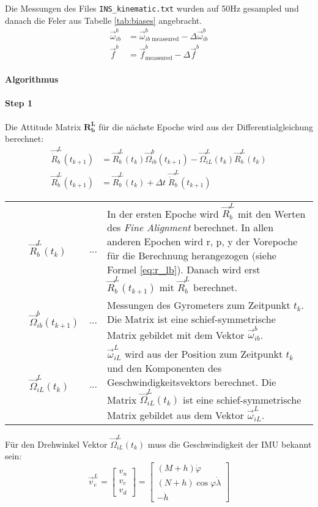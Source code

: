 Die Messungen des Files {\tt INS\_kinematic.txt} wurden auf 50\;Hz gesampled und danach die Feler aus Tabelle \ref{tab:biases} angebracht. 
\begin{align}
 	\vec{\omega}_{ib}^b &= \vec{\omega}_{ib \text{ meassured}}^b - \Delta \vec{\omega}_{ib}^b\\
    	\vec{f}^b &= \vec{f}^b_{\text{meassured}} - \Delta \vec{f}^b
\end{align}

\paragraph{Algorithmus}

\paragraph{Step 1}

Die Attitude Matrix $\mathbf{R_b^L}$ für die nächste Epoche wird aus der Differentialgleichung berechnet:
\begin{align}
	\vec{\dot{R}}_b^L(t_{k+1}) &= \vec{R}_b^L(t_k)\vec{\Omega}_{ib}^b(t_{k+1}) - \vec{\Omega}_{iL}^L(t_k)\vec{R}_b^L(t_k)\\
	\vec{R}_b^L(t_{k+1}) &= \vec{R}_b^L(t_k) + \Delta t\; \vec{\dot{R}}_b^L(t_{k+1})
\end{align}

\begin{tabularx}{\textwidth}{l c X}
	$\qquad\vec{R}_b^L(t_k)$ & ... & In der ersten Epoche wird $\vec{R}_b^L$ mit den Werten des \textit{Fine Alignment} berechnet. In allen anderen Epochen wird r, p, y der Vorepoche für die Berechnung herangezogen (siehe Formel \ref{eq:r_lb}). Danach wird erst $\vec{R}_b^L(t_{k+1})$ mit $\vec{R}_b^L$ berechnet.\vspace{.5em}\\
	$\qquad\vec{\Omega}_{ib}^b(t_{k+1})$& ... & Messungen des Gyrometers zum Zeitpunkt $t_k$. Die Matrix ist eine schief-symmetrische Matrix gebildet mit dem Vektor $\vec{\omega}_{ib}^b$. \vspace{.5em}\\
	$\qquad\vec{\Omega}_{iL}^L(t_k)$ & ... & $\vec{\omega}_{iL}^L$ wird aus der Position zum Zeitpunkt $t_k$  und den Komponenten des Geschwindigkeitsvektors berechnet. Die Matrix $\vec{\Omega}_{iL}^L(t_k)$ ist eine schief-symmetrische Matrix gebildet aus dem Vektor $\vec{\omega}_{iL}^L$.
\end{tabularx}

Für den Drehwinkel Vektor $\vec{\Omega}_{iL}^L(t_k)$  muss die Geschwindigkeit der IMU bekannt sein:
\begin{equation}
 	\vec{v}_e^L = \begin{bmatrix}v_n\\v_e\\v_d\end{bmatrix}=\begin{bmatrix}(M+h)\dot{\varphi}\\(N+h)\cos{\varphi} \dot{\lambda}\\-\dot{h}\end{bmatrix}
\end{equation}

